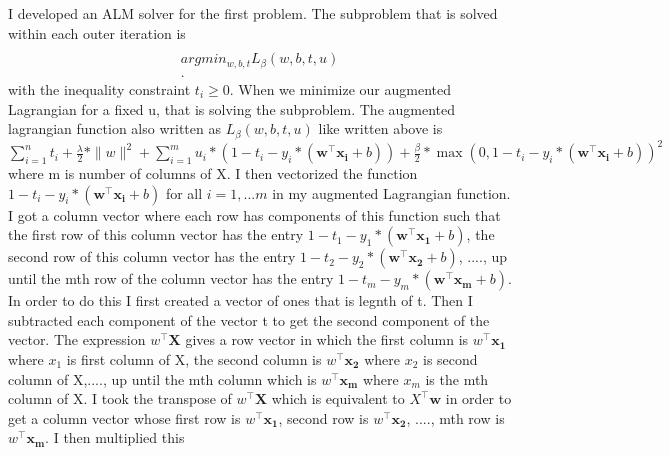 \documentclass[11pt]{article}
\DeclareMathOperator*{\argmin}{arg\,min}
\begin{document}

\\

\\
\bigskip

I developed an ALM solver for the first problem.
The subproblem that is solved within each outer iteration
is  
\begin{align}
\\argmin_{w,b,t}L_{\beta}\left(w,b,t,u \right)\\.
\end{align}
with the inequality constraint  $t_{i}\geq0$. When we minimize our augmented Lagrangian  for a fixed u, 
that is solving the subproblem.
The augmented lagrangian function also written as
$L_{\beta}\left(w,b,t,u \right)$  like written above is
$\sum\limits_{i=1}^n  t_{i}+ \frac{\lambda}{2}*\| w\|^2 
+\sum\limits_{i=1}^m u_{i}*(1-t_{i}-y_{i}*\left(\mathbf{w}^\intercal \mathbf{x_{i}}+b \right))
+ \frac{\beta}{2}* \max(0,1-t_{i}-y_{i}*\left(\mathbf{w}^\intercal \mathbf{x_{i}}+b \right))^2$ where m 
is number of columns of X. I then 
vectorized the function $1-t_{i}-y_{i}*\left(\mathbf{w}^\intercal \mathbf{x_{i}}+b \right)$ for all $i 
=1,...m$ in my augmented Lagrangian function. I got a column vector where each row has components of 
this 
function such that the first row of this column vector has the entry $1-t_{1}-y_{1}*\left(\mathbf{w}^
\intercal \mathbf{x_{1}}+b \right)$, the second row of this column vector has the entry $1-t_{2}-y_{2}*
\left(\mathbf{w}^\intercal \mathbf{x_{2}}+b \right)$, ...., up until the mth row of the column vector 
has 
the entry $1-t_{m}-y_{m}*\left(\mathbf{w}^\intercal \mathbf{x_{m}}+b \right)$. In order to do this I 
first 
created a vector of ones that is legnth of t. Then I subtracted each component of the vector t to get 
the 
second component of the vector. The expression $w^\intercal\mathbf{X}$ gives a row vector in which the 
first column is ${w}^\intercal\mathbf{x_{1}}$ where $x_{1}$ is first column of X, the second column is $
{w}^\intercal\mathbf{x_{2}}$ where $x_{2}$ is second column of X,...., up until the mth column which is 
${w}^\intercal\mathbf{x_{m}}$ where $x_{m}$ is the mth column of X. I took the transpose of 
${w}^\intercal\mathbf{X}$ which is equivalent to
${X}^\intercal\mathbf{w}$ in order to get a column vector whose first row is $w^\intercal\mathbf{x_{1}}
$, 
second row 
is $w^\intercal\mathbf{x_{2}}$, ...., mth row is $w^\intercal\mathbf{x_{m}}$. I then multiplied this 
\end{document}
